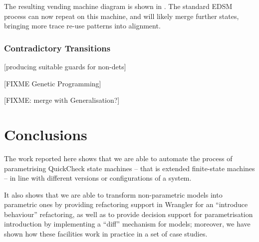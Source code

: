 The resulting vending machine diagram is shown in . The standard EDSM process can now repeat on this machine, and will likely merge further states, bringing more trace re-use patterns into alignment.

\subsubsection{Contradictory Transitions}
\label{Splitting}

[producing suitable guards for non-dets]

[FIXME Genetic Programming]


[FIXME: merge with Generalisation?]


\section{Conclusions}
\label{concs}

The work reported here shows that we are able to automate the process of parametrising QuickCheck state machines -- that 
is extended finite-state machines -- in line with different versions or configurations of a system.

It also shows that we are able to transform non-parametric models into parametric ones by providing refactoring support in Wrangler for an ``introduce behaviour'' refactoring, as well as to provide decision support for parametrisation introduction by implementing a ``diff'' mechanism for models; moreover, we have shown how these facilities work in practice in a set of case studies.

